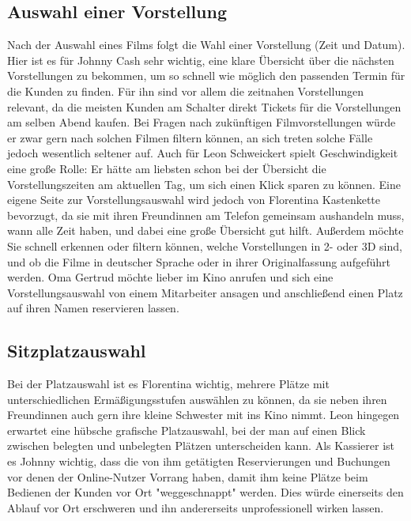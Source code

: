 \subsection{Auswahl einer Vorstellung}
Nach der Auswahl eines Films folgt die Wahl einer Vorstellung (Zeit und Datum).
Hier ist es für Johnny Cash sehr wichtig, eine klare Übersicht über die nächsten Vorstellungen zu bekommen, um so schnell wie möglich den passenden Termin für die Kunden zu finden.
Für ihn sind vor allem die zeitnahen Vorstellungen relevant, da die meisten Kunden am Schalter direkt Tickets für die Vorstellungen am selben Abend kaufen.
Bei Fragen nach zukünftigen Filmvorstellungen würde er zwar gern nach solchen Filmen filtern können, an sich treten solche Fälle jedoch wesentlich seltener auf.
Auch für Leon Schweickert spielt Geschwindigkeit eine große Rolle: Er hätte am liebsten schon bei der Übersicht die Vorstellungszeiten am aktuellen Tag, um sich einen Klick sparen zu können.
Eine eigene Seite zur Vorstellungsauswahl wird jedoch von Florentina Kastenkette bevorzugt, da sie mit ihren Freundinnen am Telefon gemeinsam aushandeln muss, wann alle Zeit haben, und dabei eine große Übersicht gut hilft.
Außerdem möchte Sie schnell erkennen oder filtern können, welche Vorstellungen in 2- oder 3D sind, und ob die Filme in deutscher Sprache oder in ihrer Originalfassung aufgeführt werden.
Oma Gertrud möchte lieber im Kino anrufen und sich eine Vorstellungsauswahl von einem Mitarbeiter ansagen und anschließend einen Platz auf ihren Namen reservieren lassen.

\subsection{Sitzplatzauswahl}
Bei der Platzauswahl ist es Florentina wichtig, mehrere Plätze mit unterschiedlichen Ermäßigungsstufen auswählen zu können, da sie neben ihren Freundinnen auch gern ihre kleine Schwester mit ins Kino nimmt.
Leon hingegen erwartet eine hübsche grafische Platzauswahl, bei der man auf einen Blick zwischen belegten und unbelegten Plätzen unterscheiden kann.
Als Kassierer ist es Johnny wichtig, dass die von ihm getätigten Reservierungen und Buchungen vor denen der Online-Nutzer Vorrang haben, damit ihm keine Plätze beim Bedienen der Kunden vor Ort "weggeschnappt" werden.
Dies würde einerseits den Ablauf vor Ort erschweren und ihn andererseits unprofessionell wirken lassen.

